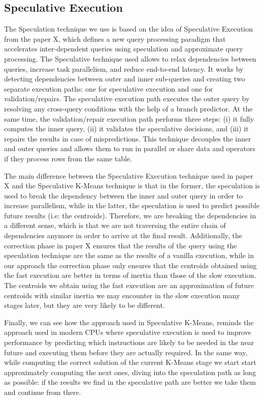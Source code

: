 \subsection{Speculative Execution}
The Speculation technique we use is based on the idea of Speculative Execution from the paper X, which defines a new query processing paradigm that accelerates inter-dependent queries using speculation and approximate query processing. The Speculative technique used allows to relax dependencies between queries, increase task parallelism, and reduce end-to-end latency. It works by detecting dependencies between outer and inner sub-queries and creating two separate execution paths: one for speculative execution and one for validation/repairs. The speculative execution path executes the outer query by resolving any cross-query conditions with the help of a branch predictor. At the same time, the validation/repair execution path performs three steps: (i) it fully computes the inner query, (ii) it validates the speculative decisions, and (iii) it repairs the results in case of mispredictions. This technique decouples the inner and outer queries and allows them to run in parallel or share data and operators if they process rows from the same table.

The main difference between the Speculative Execution technique used in paper X and the Speculative K-Means technique is that in the former, the speculation is used to break the dependency between the inner and outer query in order to increase parallelism, while in the latter, the speculation is used to predict possible future results (i.e: the centroids). Therefore, we are breaking the dependencies in a different sense, which is that we are not traversing the entire chain of dependencies anymore in order to arrive at the final result. Additionally, the correction phase in paper X ensures that the results of the query using the speculation technique are the same as the results of a vanilla execution, while in our approach the correction phase only ensures that the centroids obtained using the fast execution are better in terms of inertia than those of the slow execution. The centroids we obtain using the fast execution are an approximation of future centroids with similar inertia we may encounter in the slow execution many stages later, but they are very likely to be different.

Finally, we can see how the approach used in Speculative K-Means, reminds the approach used in modern CPUs where speculative execution is used to improve performance by predicting which instructions are likely to be needed in the near future and executing them before they are actually required. In the same way, while computing the correct solution of the current K-Means stage we start start approximately computing the next ones, diving into the speculation path as long as possible: if the results we find in the speculative path are better we take them and continue from there.


